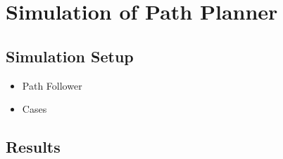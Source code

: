 \section{Simulation of Path Planner}

\subsection{Simulation Setup}

\begin{itemize}
	\item Path Follower
	\item Cases
\end{itemize}


\subsection{Results}